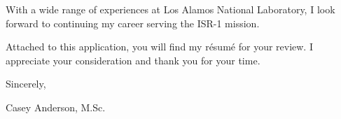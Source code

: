   \vspace{3mm}
  With a wide range of experiences at Los Alamos National Laboratory, I look forward to continuing my career serving the ISR-1 mission.
  
  \vspace{2mm}
  
  Attached to this application, you will find my r\'{e}sum\'{e} for your review. I appreciate your consideration and thank you for your time.
  
  \vspace{6mm}
  
  Sincerely, \\ \vspace{-4mm}
  
  
  Casey Anderson, M.Sc.
  
  \endgroup

